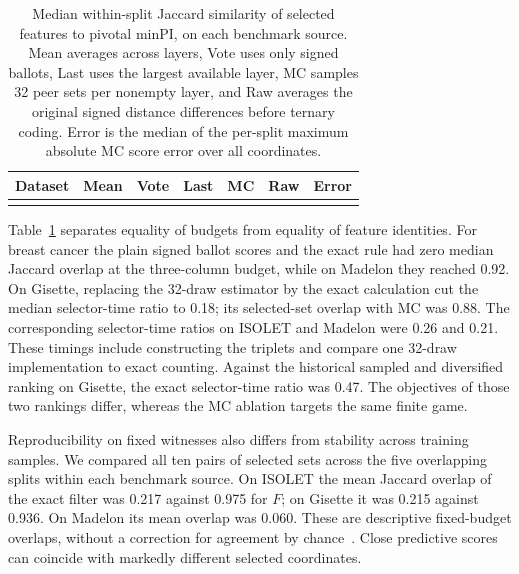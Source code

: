 \begin{table}[tbp]
\centering\small
\caption{Median within-split Jaccard similarity of selected features to pivotal minPI, on each benchmark source. Mean averages across layers, Vote uses only signed ballots, Last uses the largest available layer, MC samples 32 peer sets per nonempty layer, and Raw averages the original signed distance differences before ternary coding. Error is the median of the per-split maximum absolute MC score error over all coordinates.}
\label{tab:ablation}
\begin{tabular}{@{}lrrrrrr@{}}
\toprule Dataset & Mean & Vote & Last & MC & Raw & Error\\
\midrule
\\
\bottomrule
\end{tabular}
\end{table}
Table~\ref{tab:ablation} separates equality of budgets from equality of feature identities. For breast cancer the plain signed ballot scores and the exact rule had zero median Jaccard overlap at the three-column budget, while on Madelon they reached 0.92. On Gisette, replacing the 32-draw estimator by the exact calculation cut the median selector-time ratio to 0.18; its selected-set overlap with MC was 0.88. The corresponding selector-time ratios on ISOLET and Madelon were 0.26 and 0.21. These timings include constructing the triplets and compare one 32-draw implementation to exact counting. Against the historical sampled and diversified ranking on Gisette, the exact selector-time ratio was 0.47. The objectives of those two rankings differ, whereas the MC ablation targets the same finite game.

Reproducibility on fixed witnesses also differs from stability across training samples. We compared all ten pairs of selected sets across the five overlapping splits within each benchmark source. On ISOLET the mean Jaccard overlap of the exact filter was 0.217 against 0.975 for $F$; on Gisette it was 0.215 against 0.936. On Madelon its mean overlap was 0.060. These are descriptive fixed-budget overlaps, without a correction for agreement by chance~\citep{nogueira2018stability}. Close predictive scores can coincide with markedly different selected coordinates.

